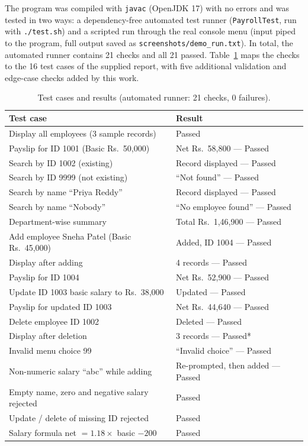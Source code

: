 \documentclass[11pt,a4paper]{article}
\begin{document}
The program was compiled with \texttt{javac} (OpenJDK 17) with no
errors and was tested in two ways: a dependency-free automated test
runner (\texttt{PayrollTest}, run with \texttt{./test.sh}) and a
scripted run through the real console menu (input piped to the
program, full output saved as \texttt{screenshots/demo\_run.txt}).
In total, the automated runner contains 21 checks and all 21 passed.
Table~\ref{tab:tests} maps the checks to the 16 test cases of the
supplied report, with five additional validation and edge-case
checks added by this work.

\begin{table}[h]
\centering
\caption{Test cases and results (automated runner: 21 checks, 0 failures).}
\label{tab:tests}
\small
\begin{tabular}{p{}p{}}
\toprule
\textbf{Test case} & \textbf{Result} \\
\midrule
Display all employees (3 sample records) & Passed \\
Payslip for ID 1001 (Basic Rs.~50,000) & Net Rs.~58,800 --- Passed \\
Search by ID 1002 (existing) & Record displayed --- Passed \\
Search by ID 9999 (not existing) & ``Not found'' --- Passed \\
Search by name ``Priya Reddy'' & Record displayed --- Passed \\
Search by name ``Nobody'' & ``No employee found'' --- Passed \\
Department-wise summary & Total Rs.~1,46,900 --- Passed \\
Add employee Sneha Patel (Basic Rs.~45,000) & Added, ID 1004 --- Passed \\
Display after adding & 4 records --- Passed \\
Payslip for ID 1004 & Net Rs.~52,900 --- Passed \\
Update ID 1003 basic salary to Rs.~38,000 & Updated --- Passed \\
Payslip for updated ID 1003 & Net Rs.~44,640 --- Passed \\
Delete employee ID 1002 & Deleted --- Passed \\
Display after deletion & 3 records --- Passed* \\
Invalid menu choice 99 & ``Invalid choice'' --- Passed \\
Non-numeric salary ``abc'' while adding & Re-prompted, then added --- Passed \\
Empty name, zero and negative salary rejected & Passed \\
Update / delete of missing ID rejected & Passed \\
Salary formula net $= 1.18 \times$ basic $- 200$ & Passed \\
\bottomrule
\end{tabular}
\end{table}
\end{document}

